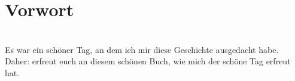 \chapter{Vorwort}
\label{chp:vorwort}

\\

Es war ein sch\"oner Tag, an dem ich mir diese Geschichte ausgedacht
habe.\\

Daher: erfreut euch an diesem sch\"onen Buch, wie mich der
sch\"one Tag erfreut hat.
